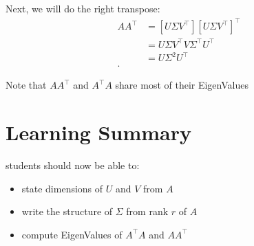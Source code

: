 \documentclass[12pt]{book}
\begin{document}
Next, we will do the right transpose:
\begin{align*}
        A A^\top &= [U\Sigma V^\top][U\Sigma V^\top]^\top\\
        &= U\Sigma V^\top V\Sigma^\top U^\top\\
        &= U\Sigma^2 U^\top\\
.\end{align*}

Note that $A A^\top$ and $A^\top A$ share most of their EigenValues
\section*{Learning Summary}
students should now be able to:
\begin{itemize}
        \item state dimensions of $U$ and  $V$ from $A$
        \item write the structure of  $\Sigma$ from rank  $r$ of  $A$
        \item compute EigenValues of  $A^\top A$ and  $A A^\top$
\end{itemize}
\end{document}
